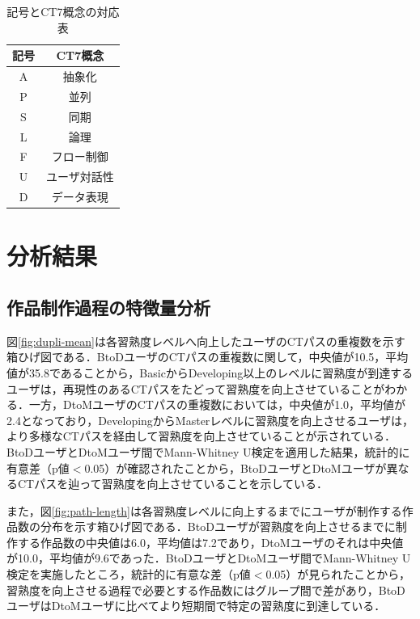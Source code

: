 \documentclass[submit,ses,noauthor]{ipsj}
\begin{document}
\begin{table}
  \caption{記号とCT7概念の対応表}
  \label{tab:ct-symobol}
  \vspace{2mm}
  \centering
  \begin{tabular}{c|c}
    \hline
    記号 & CT7概念\\
    \hline
    \hline
    A & 抽象化 \\
    \hline
    P & 並列 \\
    \hline
    S & 同期 \\
    \hline
    L & 論理 \\
    \hline
    F & フロー制御 \\
    \hline
    U & ユーザ対話性 \\
    \hline
    D & データ表現 \\
    \hline
  \end{tabular}
\end{table}




\section{分析結果}\label{sec:3-analysis}
\subsection{作品制作過程の特徴量分析}\label{subsec:path-analysis}
図\ref{fig:dupli-mean}は各習熟度レベルへ向上したユーザのCTパスの重複数を示す箱ひげ図である．BtoDユーザのCTパスの重複数に関して，中央値が10.5，平均値が35.8であることから，BasicからDeveloping以上のレベルに習熟度が到達するユーザは，再現性のあるCTパスをたどって習熟度を向上させていることがわかる．一方，DtoMユーザのCTパスの重複数においては，中央値が1.0，平均値が2.4となっており，DevelopingからMasterレベルに習熟度を向上させるユーザは，より多様なCTパスを経由して習熟度を向上させていることが示されている．BtoDユーザとDtoMユーザ間でMann-Whitney U検定\cite{Mann1947OnAT}を適用した結果，統計的に有意差（p値$<$0.05）が確認されたことから，BtoDユーザとDtoMユーザが異なるCTパスを辿って習熟度を向上させていることを示している．

また，図\ref{fig:path-length}は各習熟度レベルに向上するまでにユーザが制作する作品数の分布を示す箱ひげ図である．BtoDユーザが習熟度を向上させるまでに制作する作品数の中央値は6.0，平均値は7.2であり，DtoMユーザのそれは中央値が10.0，平均値が9.6であった．BtoDユーザとDtoMユーザ間でMann-Whitney U検定を実施したところ，統計的に有意な差（p値$<$0.05）が見られたことから，習熟度を向上させる過程で必要とする作品数にはグループ間で差があり，BtoDユーザはDtoMユーザに比べてより短期間で特定の習熟度に到達している．
\end{document}
